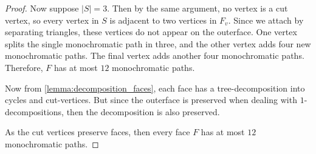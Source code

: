 \begin{proof}
	Now suppose $|S| = 3$. Then by the same argument, no vertex is a cut vertex, so every vertex in $S$ is adjacent to two vertices in $F_v$. Since we attach by separating triangles, these vertices do not appear on the outerface.
	One vertex splits the single monochromatic path in three, and the other vertex adds four new monochromatic paths. The final vertex adds another four monochromatic paths. Therefore, $F$ has at most $12$ monochromatic paths. 

	Now from \cref{lemma:decomposition_faces}, each face has a tree-decomposition into cycles and cut-vertices. But since the outerface is preserved when dealing with $1$-decompositions, then the decomposition is also preserved. 
	
	As the cut vertices preserve faces, then every face $F$ has at most $12$ monochromatic paths.
\end{proof}	
